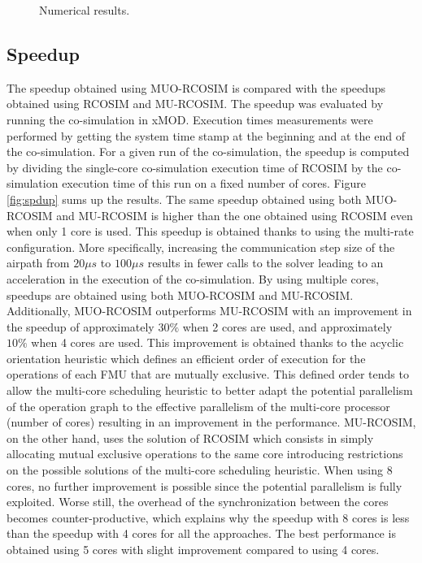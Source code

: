 \begin{figure}[phbt]
\centering

\caption{Numerical results.}
\label{fig:df}
\end{figure}

\subsection{Speedup}

The speedup obtained using MUO-RCOSIM is compared with the speedups obtained using RCOSIM and MU-RCOSIM. The speedup was evaluated by running the co-simulation in xMOD. Execution times measurements were performed by getting the system time stamp at the beginning and at the end of the co-simulation. For a given run of the co-simulation, the speedup is computed by dividing the single-core co-simulation execution time of RCOSIM by the co-simulation execution time of this run on a fixed number of cores. Figure \ref{fig:spdup} sums up the results. The same speedup obtained using both MUO-RCOSIM and MU-RCOSIM is higher than the one obtained using RCOSIM even when only 1 core is used. This speedup is obtained thanks to using the multi-rate configuration. More specifically, increasing the communication step size of the airpath from $20 {\mu}s$ to $100 {\mu}s$ results in fewer calls to the solver leading to an acceleration in the execution of the co-simulation. By using multiple cores, speedups are obtained using both MUO-RCOSIM and MU-RCOSIM. Additionally, MUO-RCOSIM outperforms MU-RCOSIM with an improvement in the speedup of approximately $30\%$ when 2 cores are used, and approximately $10\%$ when 4 cores are used. This improvement is obtained thanks to the acyclic orientation heuristic which defines an efficient order of execution for the operations of each FMU that are mutually exclusive. This defined order tends to allow the multi-core scheduling heuristic to better adapt the potential parallelism of the operation graph to the effective parallelism of the multi-core processor (number of cores) resulting in an improvement in the performance. MU-RCOSIM, on the other hand, uses the solution of RCOSIM which consists in simply allocating mutual exclusive operations to the same core introducing restrictions on the possible solutions of the multi-core scheduling heuristic. When using 8 cores, no further improvement is possible since the potential parallelism is fully exploited. Worse still, the overhead of the synchronization between the cores becomes counter-productive, which explains why the speedup with 8 cores is less than the speedup with 4 cores for all the approaches. The best performance is obtained using 5 cores with slight improvement compared to using 4 cores. 

